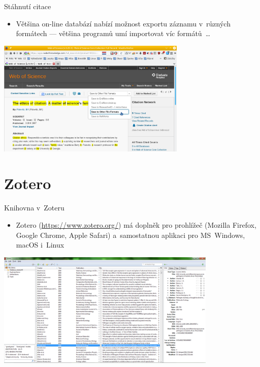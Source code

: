 \documentclass[compress, ucs, xelatex, 11pt, xcolor=svgnames, aspectratio=169,
	hyperref={
		bookmarks=true,
		unicode=true,
		colorlinks=true,
		pdftitle={Citacni software},
		plainpages=false,
		pdfauthor={Vojtech Zeisek},
		pdfsubject={Kratky uvod do citacniho software},
		pdfcreator={XeLaTeX},
		pdfkeywords={citace, reference, software, literatura},
		linkcolor=Crimson, %
		anchorcolor=Magenta, %
		citecolor=Magenta, %
		filecolor=Magenta, %
		menucolor=Magenta, %
		urlcolor=DarkTurquoise, %
		pdftex},
	url={hyphens, lowtilde} %
	]{beamer}
\begin{document}
\begin{frame}{Stáhnutí citace}
	\begin{itemize}
		\item Většina on-line databází nabízí možnost exportu záznamu v~různých formátech --- většina programů umí importovat víc formátů~\ldots
	\end{itemize}
	\begin{center}
		\includegraphics[height=5.5cm]{export_z_wos.png}
	\end{center}
\end{frame}

\section{Zotero}

\begin{frame}{Knihovna v~Zoteru}
	\begin{itemize}
		\item Zotero (\url{https://www.zotero.org/}) má doplněk pro prohlížeč (Mozilla Firefox, Google Chrome, Apple Safari) a~samostatnou aplikaci pro MS~Windows, macOS i~Linux
	\end{itemize}
	\begin{center}
		\includegraphics[height=5.5cm]{zotero.png}
	\end{center}
\end{frame}
\end{document}
